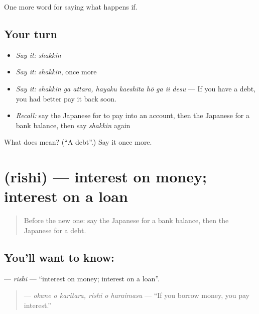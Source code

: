 \begin{grammarlens}[title={What you've built}]
One more word for saying what happens if.
\end{grammarlens}

\subsection*{Your turn}
\begin{itemize}
\raggedright
  \item \emph{Say it:} \emph{shakkin}
  \item \emph{Say it:} \emph{shakkin}, once more
  \item \emph{Say it:} \emph{shakkin ga attara, hayaku kaeshita hō ga ii desu} — If you have a debt, you had better pay it back soon.
  \item \emph{Recall:} say the Japanese for to pay into an account, then the Japanese for a bank balance, then say \emph{shakkin} again
\end{itemize}

\begin{tcolorbox}[breakable,colback=teal!4,colframe=teal!35!black,title={Before you move on}]
What does  mean? (\textquotedblleft{}A debt\textquotedblright{}.) Say it once more.
\end{tcolorbox}
\section[\texorpdfstring{\ja{りし} (rishi)}{りし (rishi)}]{ (rishi) — interest on money; interest on a loan}

\label{lesson:JA-C359-rishi}



\begin{quote}
Before the new one: say the Japanese for a bank balance, then the Japanese for a debt.
\end{quote}

\subsection*{You'll want to know: }
\textbf{} — \emph{rishi} — \textquotedblleft{}interest on money; interest on a loan\textquotedblright{}.

\begin{quote}
\textbf{  } — \emph{okane o karitara, rishi o haraimasu} — \textquotedblleft{}If you borrow money, you pay interest.\textquotedblright{}
\end{quote}


